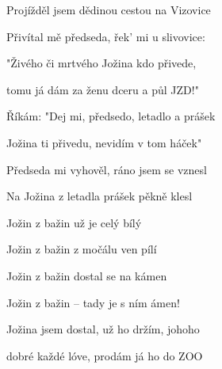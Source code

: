 \begin{song}
\bigskip

 \par
{}Projížděl jsem dědinou cestou na Vizovice \par
{}Přivítal mě předseda, řek' mi u slivovice: \par
{}"Živého či mrtvého Jožina kdo přivede, \par
{}tomu já dám za ženu dceru a půl JZD!" \par


\bigskip

\Refren

\bigskip

 \par
{}Říkám: "Dej mi, předsedo, letadlo a prášek \par
{}Jožina ti přivedu, nevidím v tom háček" \par
{}Předseda mi vyhověl, ráno jsem se vznesl \par
{}Na Jožina z letadla prášek pěkně klesl \par

\bigskip

Jožin z bažin už je celý bílý \par
{}Jožin z bažin z močálu ven pílí \par
{}Jožin z bažin dostal se na kámen \par
{}Jožin z bažin – tady je s ním ámen! \par
{}Jožina jsem dostal, už ho držím, johoho  \par
{}dobré každé lóve, prodám já ho do ZOO \par

\bigskip

     \par
{}    \par

\end{song}
